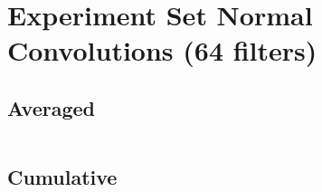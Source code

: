 \documentclass{article}%
\begin{document}
%
\normalsize%
\section{Experiment Set Normal Convolutions (64 filters)}%
\label{sec:Experiment Set Normal Convolutions (64 filters)}%
\subsection{Averaged}%
\label{subsec:Averaged}%
\begin{tabular}{|r|c|}%
\hline%
\end{tabular}

%
\subsection{Cumulative}%
\label{subsec:Cumulative}%
\begin{tabular}{|r|c|}%
\hline%
\end{tabular}

%
\end{document}
